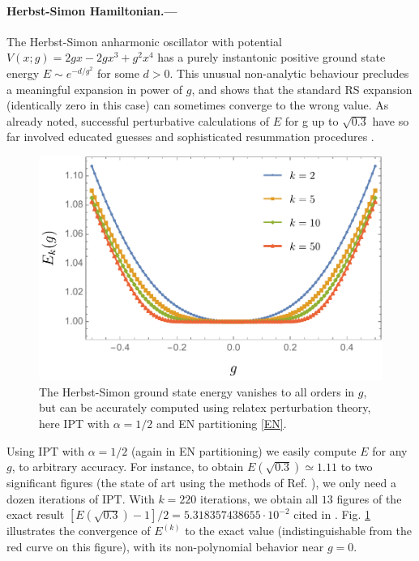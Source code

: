 \documentclass[aps,prl,reprint]{revtex4-2}
\begin{document}
	\paragraph{Herbst-Simon Hamiltonian.---} The Herbst-Simon anharmonic oscillator with potential $V(x;g)=2gx-2gx^3+g^2 x^4$ has a purely instantonic positive ground state energy $E\sim e^{-d/g^{2}}$ for some $d>0$. This unusual non-analytic behaviour precludes a meaningful expansion in power of $g$, and shows that the standard RS expansion (identically zero in this case) can sometimes converge to the wrong value. As already noted, successful perturbative calculations of $E$ for g up to $\sqrt{0.3}$ have so far involved educated guesses and sophisticated resummation procedures \cite{ZinnJustinMultiinstantonsexactresults2004, SurzhykovQuantumdotpotentials2006}.


	\begin{figure}
	\hspace*{-1.1cm}
	\includegraphics[width = \columnwidth]{Herbst-Simon.pdf}
	\caption{The Herbst-Simon ground state energy vanishes to all orders in $g$, but can be accurately computed using relatex perturbation theory, here IPT with $\alpha = 1/2$ and EN partitioning \eqref{EN}.
	}
	\label{fig:HS}
	\end{figure}

	Using $\textrm{IPT}$ with $\alpha = 1/2$ (again in EN partitioning) we easily compute $E$ for any $g$, to arbitrary accuracy. For instance, to obtain $E(\sqrt{0.3})\simeq 1.11$ to two significant figures (the state of art using the methods of Ref. \cite{SurzhykovQuantumdotpotentials2006}), we only need a dozen iterations of $\textrm{IPT}$. With $k=220$ iterations, we obtain all $13$ figures of the exact result $[E(\sqrt{0.3})-1]/2=5.318357438655\cdot 10^{-2}$ cited in \cite[Table III]{SurzhykovQuantumdotpotentials2006}. Fig. \ref{fig:HS} illustrates the convergence of $E^{(k)}$ to the exact value (indistinguishable from the red curve on this figure), with its non-polynomial behavior near $g=0$.
\end{document}
